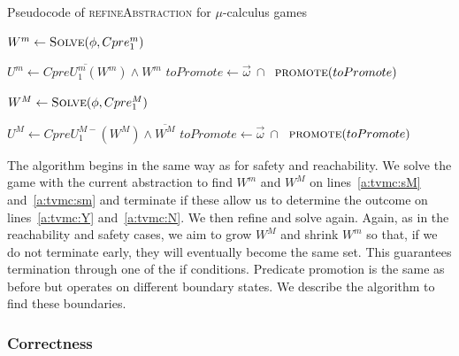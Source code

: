 \begin{algorithm}

\caption{Pseudocode of \textsc{refineAbstraction} for $\mu$-calculus games}
\label{alg:refineAbstraction}

\begin{algorithmic}[1]


        \State $W^m \gets \textsc{Solve}(\phi, Cpre_1^m)$

        \State $U^m \gets \overline{CpreU_1^{m}(W^m)} \land W^m$
            \State $toPromote \gets \vec{\omega}~\cap~$
            \State $\Call{promote}{toPromote}$
        \Else
            \State {}
        \EndIf


        \State $W^M \gets \textsc{Solve}(\phi, Cpre_1^M)$

        \State $U^M \gets CpreU_1^{M-}(W^M) \land \overline{W^M}$
            \State $toPromote \gets \vec{\omega}~\cap~$
            \State $\Call{promote}{toPromote}$
        \Else
            \State {}
        \EndIf

    \EndIf
\EndFunction
\end{algorithmic}
\end{algorithm}

The algorithm begins in the same way as for safety and reachability. We solve the game with the current abstraction to find $W^m$ and $W^M$ on lines~\ref{a:tvmc:sM} and~\ref{a:tvmc:sm} and terminate if these allow us to determine the outcome on lines~\ref{a:tvmc:Y} and~\ref{a:tvmc:N}. We then refine and solve again. Again, as in the reachability and safety cases, we aim to grow $W^M$ and shrink $W^m$ so that, if we do not terminate early, they will eventually become the same set. This guarantees termination through one of the if conditions. Predicate promotion is the same as before but operates on different boundary states. We describe the algorithm to find these boundaries. 

\subsubsection{Correctness}

